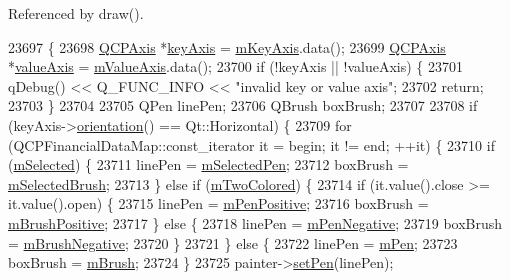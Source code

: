 Referenced by draw().


\begin{DoxyCode}
23697                                                   \{
23698   \hyperlink{class_q_c_p_axis}{QCPAxis} *\hyperlink{class_q_c_p_abstract_plottable_a72c7a09c22963f2c943f07112b311103}{keyAxis} = \hyperlink{class_q_c_p_abstract_plottable_a426f42e254d0f8ce5436a868c61a6827}{mKeyAxis}.data();
23699   \hyperlink{class_q_c_p_axis}{QCPAxis} *\hyperlink{class_q_c_p_abstract_plottable_a3106f9d34d330a6097a8ec5905e5b519}{valueAxis} = \hyperlink{class_q_c_p_abstract_plottable_a2901452ca4aea911a1827717934a4bda}{mValueAxis}.data();
23700   \textcolor{keywordflow}{if} (!keyAxis || !valueAxis) \{
23701     qDebug() << Q\_FUNC\_INFO << \textcolor{stringliteral}{"invalid key or value axis"};
23702     \textcolor{keywordflow}{return};
23703   \}
23704 
23705   QPen linePen;
23706   QBrush boxBrush;
23707 
23708   \textcolor{keywordflow}{if} (keyAxis->\hyperlink{class_q_c_p_axis_a57483f2f60145ddc9e63f3af53959265}{orientation}() == Qt::Horizontal) \{
23709     \textcolor{keywordflow}{for} (QCPFinancialDataMap::const\_iterator it = begin; it != end; ++it) \{
23710       \textcolor{keywordflow}{if} (\hyperlink{class_q_c_p_abstract_plottable_a43f68a0603e9bcd016bdfa6d9d5c41c9}{mSelected}) \{
23711         linePen = \hyperlink{class_q_c_p_abstract_plottable_a10619472f5d5e10e9519a599f1cf5576}{mSelectedPen};
23712         boxBrush = \hyperlink{class_q_c_p_abstract_plottable_aea3c0da30c7a8be23ad5f2d9bca36762}{mSelectedBrush};
23713       \} \textcolor{keywordflow}{else} \textcolor{keywordflow}{if} (\hyperlink{class_q_c_p_financial_a6afe919190b884d9bac026cefcc8c0a8}{mTwoColored}) \{
23714         \textcolor{keywordflow}{if} (it.value().close >= it.value().open) \{
23715           linePen = \hyperlink{class_q_c_p_financial_aa6599186f417ba615caebb3f6c762bd8}{mPenPositive};
23716           boxBrush = \hyperlink{class_q_c_p_financial_ab7e6eed16260a2f88ca6bd940dffea79}{mBrushPositive};
23717         \} \textcolor{keywordflow}{else} \{
23718           linePen = \hyperlink{class_q_c_p_financial_a263fbfefde2cc19c8d4024a8319c2bbb}{mPenNegative};
23719           boxBrush = \hyperlink{class_q_c_p_financial_acb0e31874b7a1deb56bd42e8ab3e68f2}{mBrushNegative};
23720         \}
23721       \} \textcolor{keywordflow}{else} \{
23722         linePen = \hyperlink{class_q_c_p_abstract_plottable_a67bc0622fd1b9fa14e54c14922dcec66}{mPen};
23723         boxBrush = \hyperlink{class_q_c_p_abstract_plottable_a33f00674c0161c13315ab9da0895418e}{mBrush};
23724       \}
23725       painter->\hyperlink{class_q_c_p_painter_af9c7a4cd1791403901f8c5b82a150195}{setPen}(linePen);

\end{DoxyCode}
